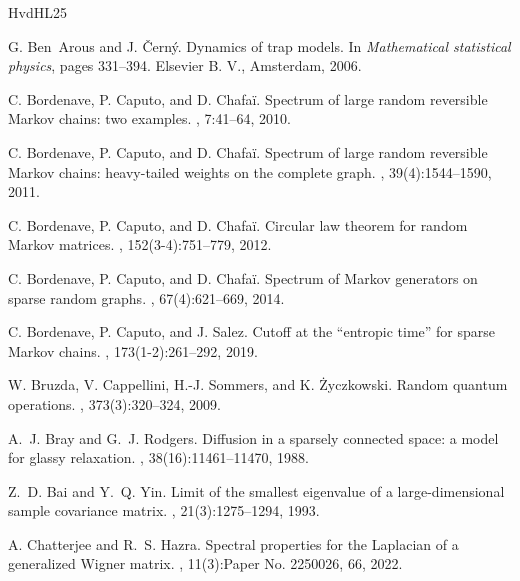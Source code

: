 \documentclass[12pt]{amsart}
\DeclareMathOperator{\1}{\mathbf{1}}
\begin{document}
\newcommand{\etalchar}[1]{$^{#1}$}
\begin{thebibliography}{HvdHL25}

G. Ben~Arous and J. \v{C}ern\'{y}.
\newblock Dynamics of trap models.
\newblock In {\em Mathematical statistical physics}, pages 331--394. Elsevier B. V., Amsterdam, 2006.

C. Bordenave, P. Caputo, and D. Chafa\"i.
\newblock Spectrum of large random reversible {M}arkov chains: two examples.
, 7:41--64, 2010.

C. Bordenave, P. Caputo, and D. Chafa\"i.
\newblock Spectrum of large random reversible {M}arkov chains: heavy-tailed weights on the complete graph.
, 39(4):1544--1590, 2011.

C. Bordenave, P. Caputo, and D. Chafa\"i.
\newblock Circular law theorem for random {M}arkov matrices.
, 152(3-4):751--779, 2012.

C. Bordenave, P. Caputo, and D. Chafa\"i.
\newblock Spectrum of {M}arkov generators on sparse random graphs.
, 67(4):621--669, 2014.

C. Bordenave, P. Caputo, and J. Salez.
\newblock Cutoff at the ``entropic time'' for sparse {M}arkov chains.
, 173(1-2):261--292, 2019.

W. Bruzda, V. Cappellini, H.-J. Sommers, and K. \.Zyczkowski.
\newblock Random quantum operations.
, 373(3):320--324, 2009.

A.~J. Bray and G.~J. Rodgers.
\newblock Diffusion in a sparsely connected space: a model for glassy relaxation.
, 38(16):11461--11470, 1988.

Z.~D. Bai and Y.~Q. Yin.
\newblock Limit of the smallest eigenvalue of a large-dimensional sample covariance matrix.
, 21(3):1275--1294, 1993.

A. Chatterjee and R.~S. Hazra.
\newblock Spectral properties for the {L}aplacian of a generalized {W}igner matrix.
, 11(3):Paper No. 2250026, 66, 2022.


\end{thebibliography}
\end{document}
